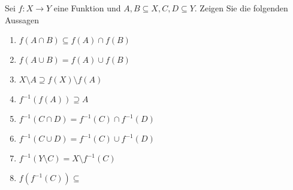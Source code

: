 \documentclass{article}
\begin{document}
Sei $f \colon X \to Y$ eine Funktion und $A, B \subseteq X, C, D \subseteq Y$. Zeigen Sie die folgenden Aussagen

\begin{enumerate}
\item $f(A \cap B) \subseteq f(A) \cap f(B)$
\item $f(A \cup B) = f(A) \cup f(B)$
\item $X \setminus A \supseteq f(X) \setminus f(A)$
\item $f^{-1}(f(A)) \supseteq A$
\item $f^{-1}(C \cap D) = f^{-1}(C) \cap f^{-1}(D)$
\item $f^{-1}(C \cup D) = f^{-1}(C) \cup f^{-1}(D)$
\item $f^{-1}(Y \setminus C) = X \setminus f^{-1}(C)$
\item $f(f^{-1}(C)) \subseteq $
\end{enumerate}
\end{document}

